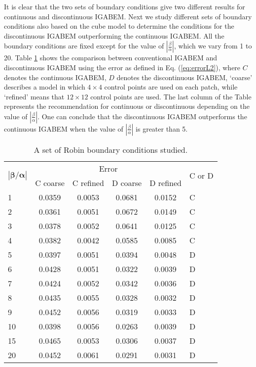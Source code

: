\documentclass[review]{elsarticle}
\begin{document}
It is clear that the two sets of boundary conditions give two different results for continuous and discontinuous IGABEM. Next we study different sets of boundary conditions also based on the cube model to determine the conditions for the discontinuous IGABEM outperforming the continuous IGABEM. All the boundary conditions are fixed except for the value of $\left|\frac{\beta}{\alpha}\right|$, which we vary from 1 to 20. Table \ref{cord} shows the comparison between conventional IGABEM and discontinuous IGABEM using the error as defined in Eq. (\ref{eq:errorL2}), where $C$ denotes the continuous IGABEM, $D$ denotes the discontinuous IGABEM, `coarse' describes a model in which $4\times 4$ control points are used on each patch, while `refined' means that $12\times 12$ control points are used. The last column of the Table represents the recommendation for continuous or discontinuous depending on the value of $\left|\frac{\beta}{\alpha}\right|$. One can conclude that the discontinuous IGABEM outperforms the continuous IGABEM when the value of $\left|\frac{\beta}{\alpha}\right|$ is greater than 5. 


\setlength{\arrayrulewidth}{0.5mm}
\setlength{\tabcolsep}{14pt}
\renewcommand{\arraystretch}{1}
\begin{table}\footnotesize
	\caption{A set of Robin boundary conditions studied.}
	
	\begin{tabular}{|p{0.3cm}|c|c|c|c|p{0.5cm}|}
		\hline
		\multirow{2}{*}{\!\!\!\!$|\boldsymbol{\beta/\alpha}|$} &\multicolumn{4}{|c|}{Error} & \multirow{2}{*}{\!\!\!C or D} \\
		\cline{2-5}
		& C coarse & C refined & D coarse & D refined &  \\
		\hline
		1 & 0.0359 & 0.0053  & 0.0681 & 0.0152 & C \\
		2 & 0.0361 & 0.0051  & 0.0672 & 0.0149 & C \\
		3 & 0.0378 & 0.0052  & 0.0641 & 0.0125 & C \\
		4 & 0.0382 & 0.0042  & 0.0585 & 0.0085 & C \\
		\hline 
		5 & 0.0397 & 0.0051 & 0.0394 & 0.0048 & D \\
		6 & 0.0428 & 0.0051  & 0.0322 & 0.0039 & D \\
		7 & 0.0424 & 0.0052 & 0.0342 & 0.0036 & D \\
		8 & 0.0435 & 0.0055  & 0.0328 & 0.0032 & D \\
		9 & 0.0452 & 0.0056  & 0.0319 & 0.0033 & D \\
		10 & 0.0398 & 0.0056  & 0.0263 & 0.0039 & D \\
		15 & 0.0465 & 0.0053  & 0.0306 & 0.0037 & D \\
		20 & 0.0452 & 0.0061  & 0.0291 & 0.0031 & D \\
		\hline
	\end{tabular}
	\label{cord}
\end{table}
\end{document}
